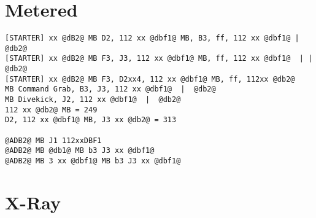 \documentclass[main.tex]{subfiles}
\begin{document}
\section{Metered}


\begin{lstlisting}[language=FG]
[STARTER] xx @dB2@ MB D2, 112 xx @dbf1@ MB, B3, ff, 112 xx @dbf1@ |  @db2@
[STARTER] xx @dB2@ MB F3, J3, 112 xx @dbf1@ MB, ff, 112 xx @dbf1@  | |  @db2@
[STARTER] xx @dB2@ MB F3, D2xx4, 112 xx @dbf1@ MB, ff, 112xx @db2@
MB Command Grab, B3, J3, 112 xx @dbf1@  |  @db2@
MB Divekick, J2, 112 xx @dbf1@  |  @db2@
112 xx @db2@ MB = 249
D2, 112 xx @dbf1@ MB, J3 xx @db2@ = 313

@ADB2@ MB J1 112xxDBF1
@ADB2@ MB @db1@ MB b3 J3 xx @dbf1@
@ADB2@ MB 3 xx @dbf1@ MB b3 J3 xx @dbf1@
\end{lstlisting}

\section{X-Ray}
\begin{lstlisting}[language=FG]

\end{lstlisting}
\end{document}
